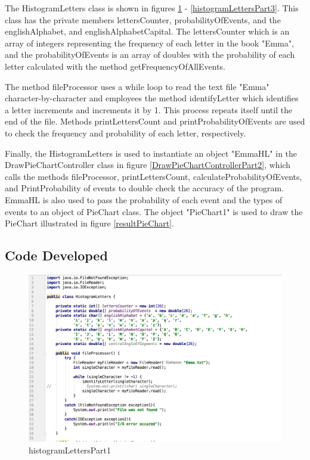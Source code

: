 \documentclass[a4paper,12pt]{article}
\begin{document}
The HistogramLetters class is shown in figures \ref{histogramLettersPart1} - \ref{histogramLettersPart3}. This class has the private members lettersCounter, probabilityOfEvents, and the englishAlphabet, and englishAlphabetCapital. The lettersCounter which is an array of integers representing the frequency of each letter in the book "Emma", and the probabilityOfEvents is an array of doubles with the probability of each letter calculated with the method getFrequencyOfAllEvents. \newline

\vspace{0.25cm}
The method fileProcessor uses a  while loop to read the text file "Emma" character-by-character and employees the method identifyLetter which identifies a letter increments and increments it by 1. This process repeats itself until the end of the file. Methods printLettersCount and printProbabilityOfEvents are used to check the frequency and probability of each letter, respectively.  \newline


\vspace{0.25cm}
 Finally, the HistogramLetters is used to instantiate  an object "EmmaHL" in the DrawPieChartController class in figure \ref{DrawPieChartControllerPart2}, which calls the methods fileProcessor, printLettersCount, calculateProbabilityOfEvents, and PrintProbability of events to double check the accuracy of the program. EmmaHL is also used to pass the probability of each event and the types of events to an object of PieChart class. The object "PieChart1" is used to draw the PieChart illustrated in figure \ref{resultPieChart}.



\subsection{Code Developed}

\begin{figure}[H]
   \centering
   \includegraphics[width = 19cm]{histogramLettersPart1} %
   \caption{histogramLettersPart1}
   \label{histogramLettersPart1}
\end{figure}
\end{document}

